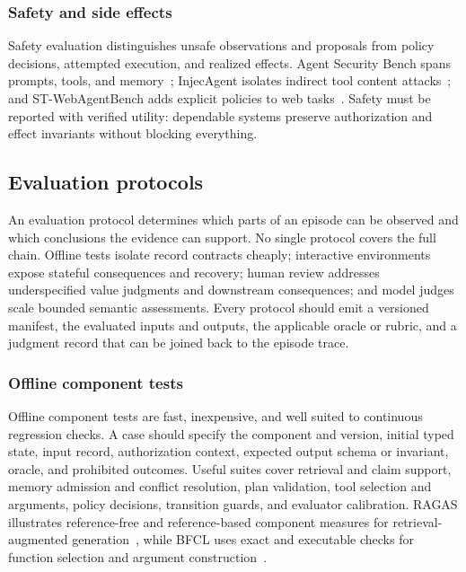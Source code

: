\subsubsection{Safety and side effects}

Safety evaluation distinguishes unsafe observations and proposals from policy decisions, attempted execution, and realized effects. Agent Security Bench spans prompts, tools, and memory~\cite{zhang2024agentsecuritybench}; InjecAgent isolates indirect tool content attacks~\cite{zhan2024injecagent}; and ST-WebAgentBench adds explicit policies to web tasks~\cite{levy2026stwebagentbench}. Safety must be reported with verified utility: dependable systems preserve authorization and effect invariants without blocking everything.

\subsection{Evaluation protocols}

An evaluation protocol determines which parts of an episode can be observed and which conclusions the evidence can support. No single protocol covers the full chain. Offline tests isolate record contracts cheaply; interactive environments expose stateful consequences and recovery; human review addresses underspecified value judgments and downstream consequences; and model judges scale bounded semantic assessments. Every protocol should emit a versioned manifest, the evaluated inputs and outputs, the applicable oracle or rubric, and a judgment record that can be joined back to the episode trace.

\subsubsection{Offline component tests}

Offline component tests are fast, inexpensive, and well suited to continuous regression checks. A case should specify the component and version, initial typed state, input record, authorization context, expected output schema or invariant, oracle, and prohibited outcomes. Useful suites cover retrieval and claim support, memory admission and conflict resolution, plan validation, tool selection and arguments, policy decisions, transition guards, and evaluator calibration. RAGAS illustrates reference-free and reference-based component measures for retrieval-augmented generation~\cite{es2024ragas}, while BFCL uses exact and executable checks for function selection and argument construction~\cite{patil2025bfcl}.

